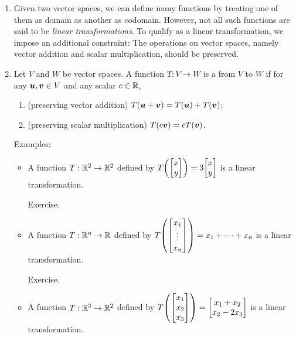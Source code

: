 \begin{enumerate}
\item Given two vector spaces, we can define many functions by treating one of
them as domain as another as codomain. However, not all such functions are said
to be \emph{linear transformations}. To qualify as a linear transformation, we
impose an additional constraint: The operations on vector spaces, namely vector
addition and scalar multiplication, should be preserved.

\item Let \(V\) and \(W\) be vector spaces. A function \(T:V\to W\) is a
 from \(V\) to \(W\) if for any
\(\vb*{u},\vb*{v}\in V\) and any scalar \(c\in\mathbb{R}\),
\begin{enumerate}
\item (preserving vector addition) \(T(\vb*{u}+\vb*{v})=T(\vb*{u})+T(\vb*{v})\);
\item (preserving scalar multiplication) \(T(c\vb*{v})=cT(\vb*{v})\).
\end{enumerate}
Examples:
\begin{itemize}
\item A function \(T:\mathbb{R}^2\to\mathbb{R}^2\) defined by \(T\qty(\mqty[x\\ y])=3\mqty[x\\ y]\)
is a linear transformation.

\begin{pf}
Exercise.
\end{pf}
\item A function \(T:\mathbb{R}^n\to\mathbb{R}\) defined by \(T\qty(\mqty[x_1\\ \vdots\\ x_n])=x_1+\dotsb+x_n\)
is a linear transformation.

\begin{pf}
Exercise.
\end{pf}
\item A function \(T:\mathbb{R}^3\to\mathbb{R}^2\) defined by \(T\qty(\mqty[x_1\\ x_2\\ x_3])=\mqty[x_1+x_2\\ x_2-2x_3]\)
is a linear transformation.


\end{itemize}
\end{enumerate}
